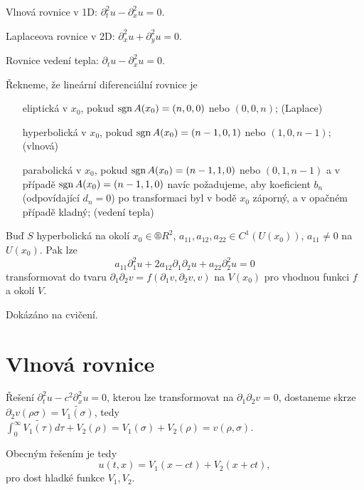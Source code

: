 \documentclass[12pt]{article}					%
\begin{document}
\begin{priklady}
	Vlnová rovnice v 1D: $\partial_t^2 u - \partial_x^2 u = 0$.

	Laplaceova rovnice v 2D: $\partial_x^2 u + \partial_y^2 u = 0$.

	Rovnice vedení tepla: $\partial_t u - \partial_x^2 u = 0$.
\end{priklady}

\begin{definice}
	Řekneme, že lineární diferenciální rovnice je
	\begin{itemize}
		\item[eliptická] v $x_0$, pokud $\operatorname{sgn} A(x_0) = (n, 0, 0)$ nebo $(0, 0, n)$; (Laplace)
		\item[hyperbolická] v $x_0$, pokud $\operatorname{sgn} A(x_0) = (n-1, 0, 1)$ nebo $(1, 0, n-1)$; (vlnová)
		\item[parabolická] v $x_0$, pokud $\operatorname{sgn} A(x_0) = (n-1, 1, 0)$ nebo $(0, 1, n-1)$ a v případě $\operatorname{sgn} A(x_0) = (n-1, 1, 0)$ navíc požadujeme, aby koeficient $b_n$ (odpovídající $d_n=0$) po transformaci byl v bodě $x_0$ záporný, a v opačném případě kladný; (vedení tepla)
	\end{itemize}
\end{definice}

\begin{veta}
	Buď $S$ hyperbolická na okolí $x_0 \in ®R^2$, $a_{11}, a_{12}, a_{22} \in C^1(U(x_0))$, $a_{11} ≠ 0$ na $U(x_0)$. Pak lze 
	$$ a_{11} \partial_1^2 u + 2a_{12} \partial_1\partial_2 u + a_{22} \partial_2^2 u = 0 $$
	transformovat do tvaru $\partial_1\partial_2 v = f(\partial_1v, \partial_2v, v)$ na $V(x_0)$ pro vhodnou funkci $f$ a okolí $V$.

	\begin{dukazin}
		Dokázáno na cvičení.
	\end{dukazin}
\end{veta}

\section{Vlnová rovnice}
\begin{tvrzeni}
	Řešení $\partial_t^2 u - c^2 \partial_x^2 u = 0$, kterou lze transformovat na $\partial_1\partial_2 v = 0$, dostaneme skrze $\partial_2 v(\rho \sigma) = \tilde{V_1(\sigma)}$, tedy $\int_0^∞ \tilde{V_1(\tau)} d\tau + V_2(\rho) = V_1(\sigma) + V_2(\rho) = v(\rho, \sigma)$.

	Obecným řešením je tedy
	$$ u(t, x) = V_1(x - ct) + V_2(x + ct), $$
	pro dost hladké funkce $V_1, V_2$.
\end{tvrzeni}
\end{document}
